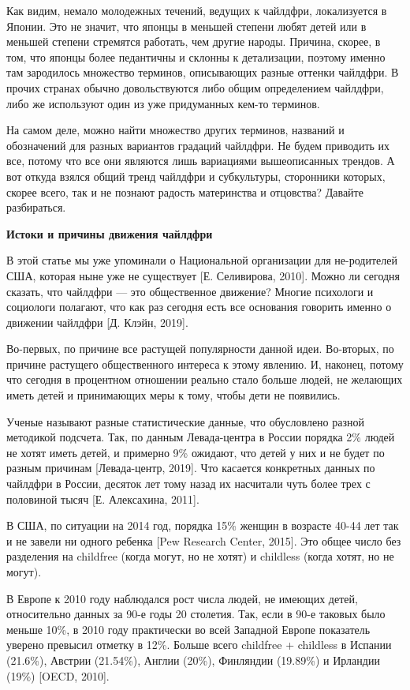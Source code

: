 Как видим, немало молодежных течений, ведущих к чайлдфри, локализуется в Японии. Это не значит, что японцы в меньшей степени любят детей или в меньшей степени стремятся работать, чем другие народы. Причина, скорее, в том, что японцы более педантичны и склонны к детализации, поэтому именно там зародилось множество терминов, описывающих разные оттенки чайлдфри. В прочих странах обычно довольствуются либо общим определением чайлдфри, либо же используют один из уже придуманных кем-то терминов.

На самом деле, можно найти множество других терминов, названий и обозначений для разных вариантов градаций чайлдфри. Не будем приводить их все, потому что все они являются лишь вариациями вышеописанных трендов. А вот откуда взялся общий тренд чайлдфри и субкультуры, сторонники которых, скорее всего, так и не познают радость материнства и отцовства? Давайте разбираться.

\textbf{Истоки и причины движения чайлдфри}

В этой статье мы уже упоминали о Национальной организации для не-родителей США, которая ныне уже не существует [Е. Селивирова, 2010]. Можно ли сегодня сказать, что чайлдфри --- это общественное движение? Многие психологи и социологи полагают, что как раз сегодня есть все основания говорить именно о движении чайлдфри [Д. Клэйн, 2019].

Во-первых, по причине все растущей популярности данной идеи. Во-вторых, по причине растущего общественного интереса к этому явлению. И, наконец, потому что сегодня в процентном отношении реально стало больше людей, не желающих иметь детей и принимающих меры к тому, чтобы дети не появились.

Ученые называют разные статистические данные, что обусловлено разной методикой подсчета. Так, по данным Левада-центра в России порядка 2\% людей не хотят иметь детей, и примерно 9\% ожидают, что детей у них и не будет по разным причинам [Левада-центр, 2019]. Что касается конкретных данных по чайлдфри в России, десяток лет тому назад их насчитали чуть более трех с половиной тысяч [Е. Алексахина, 2011].

В США, по ситуации на 2014 год, порядка 15\% женщин в возрасте 40-44 лет так и не завели ни одного ребенка [Pew Research Center, 2015]. Это общее число без разделения на childfree (когда могут, но не хотят) и childless (когда хотят, но не могут).

В Европе к 2010 году наблюдался рост числа людей, не имеющих детей, относительно данных за 90-е годы 20 столетия. Так, если в 90-е таковых было меньше 10\%, в 2010 году практически во всей Западной Европе показатель уверено превысил отметку в 12\%. Больше всего childfree + childless в Испании (21.6\%), Австрии (21.54\%), Англии (20\%), Финляндии (19.89\%) и Ирландии (19\%) [OECD, 2010].

